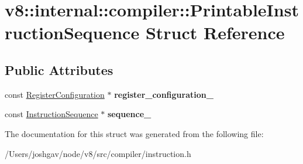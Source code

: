 \hypertarget{structv8_1_1internal_1_1compiler_1_1_printable_instruction_sequence}{}\section{v8\+:\+:internal\+:\+:compiler\+:\+:Printable\+Instruction\+Sequence Struct Reference}
\label{structv8_1_1internal_1_1compiler_1_1_printable_instruction_sequence}
\subsection*{Public Attributes}
\begin{DoxyCompactItemize}
\item 
const \hyperlink{classv8_1_1internal_1_1_register_configuration}{Register\+Configuration} $\ast$ {\bfseries register\+\_\+configuration\+\_\+}\hypertarget{structv8_1_1internal_1_1compiler_1_1_printable_instruction_sequence_acf2189b7ab2052a6b8e9e83b81ba369d}{}\label{structv8_1_1internal_1_1compiler_1_1_printable_instruction_sequence_acf2189b7ab2052a6b8e9e83b81ba369d}

\item 
const \hyperlink{classv8_1_1internal_1_1compiler_1_1_instruction_sequence}{Instruction\+Sequence} $\ast$ {\bfseries sequence\+\_\+}\hypertarget{structv8_1_1internal_1_1compiler_1_1_printable_instruction_sequence_ab38785c51dcf66e171a58e472edc4533}{}\label{structv8_1_1internal_1_1compiler_1_1_printable_instruction_sequence_ab38785c51dcf66e171a58e472edc4533}

\end{DoxyCompactItemize}


The documentation for this struct was generated from the following file\+:\begin{DoxyCompactItemize}
\item 
/\+Users/joshgav/node/v8/src/compiler/instruction.\+h\end{DoxyCompactItemize}
